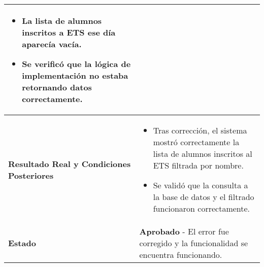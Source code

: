 \begin{longtable}{|p{5cm}|p{10cm}|}
\begin{itemize}
		\item La lista de alumnos inscritos a ETS ese día aparecía vacía.
		\item Se verificó que la lógica de implementación no estaba retornando datos correctamente.
	\end{itemize} \\
	\hline
	\textbf{Resultado Real y Condiciones Posteriores} & 
	\begin{itemize}
		\item Tras corrección, el sistema mostró correctamente la lista de alumnos inscritos al ETS filtrada por nombre.
		\item Se validó que la consulta a la base de datos y el filtrado funcionaron correctamente.
	\end{itemize} \\
	\hline
	\textbf{Estado} & 
	\textbf{Aprobado} - El error fue corregido y la funcionalidad se encuentra funcionando. \\
	\hline
\end{longtable}